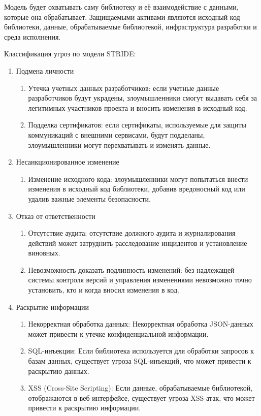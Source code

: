 Модель будет охватывать саму библиотеку и её взаимодействие с данными, которые она обрабатывает. Защищаемыми активами являются исходный код библиотеки, данные, обрабатываемые библиотекой, инфраструктура разработки и среда исполнения.

Классификация угроз по модели STRIDE:
\begin{enumerate}
    \item Подмена личности
    \begin{enumerate}
        \item Утечка учетных данных разработчиков: если учетные данные разработчиков будут украдены, злоумышленники смогут выдавать себя за легитимных участников проекта и вносить изменения в исходный код.
        \item Подделка сертификатов: если сертификаты, используемые для защиты коммуникаций с внешними сервисами, будут подделаны, злоумышленники могут перехватывать и изменять данные.
    \end{enumerate}

    \item Несанкционированное изменение
    \begin{enumerate}
        \item Изменение исходного кода: злоумышленники могут попытаться внести изменения в исходный код библиотеки, добавив вредоносный код или удалив важные элементы безопасности.
    \end{enumerate}

    \item Отказ от ответственности
    \begin{enumerate}
        \item Отсутствие аудита: отсутствие должного аудита и журналирования действий может затруднить расследование инцидентов и установление виновных.
        \item Невозможность доказать подлинность изменений: без надлежащей системы контроля версий и управления изменениями невозможно точно установить, кто и когда вносил изменения в код.
    \end{enumerate}

    \item Раскрытие информации
    \begin{enumerate}
        \item Некорректная обработка данных: Некорректная обработка JSON-данных может привести к утечке конфиденциальной информации.
        \item SQL-инъекции: Если библиотека используется для обработки запросов к базам данных, существует угроза SQL-инъекций, что может привести к раскрытию данных.
        \item XSS (Cross-Site Scripting): Если данные, обрабатываемые библиотекой, отображаются в веб-интерфейсе, существует угроза XSS-атак, что может привести к раскрытию информации.
    \end{enumerate}


\end{enumerate}
